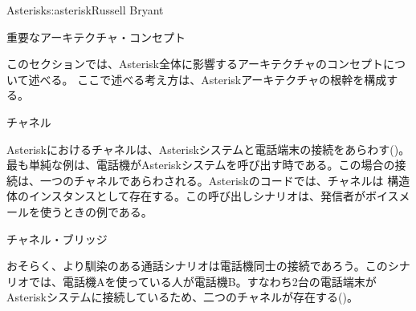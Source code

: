 \begin{aosachapter}{Asterisk}{s:asterisk}{Russell Bryant}
\begin{aosasect1}{重要なアーキテクチャ・コンセプト}

このセクションでは、Asterisk全体に影響するアーキテクチャのコンセプトについて述べる。
ここで述べる考え方は、Asteriskアーキテクチャの根幹を構成する。

\begin{aosasect2}{チャネル}

Asteriskにおけるチャネルは、Asteriskシステムと電話端末の接続をあらわす()。最も単純な例は、電話機がAsteriskシステムを呼び出す時である。この場合の接続は、一つのチャネルであらわされる。Asteriskのコードでは、チャネルは 構造体のインスタンスとして存在する。この呼び出しシナリオは、発信者がボイスメールを使うときの例である。


\end{aosasect2}

\begin{aosasect2}{チャネル・ブリッジ}

おそらく、より馴染のある通話シナリオは電話機同士の接続であろう。このシナリオでは、電話機Aを使っている人が電話機B。すなわち2台の電話端末がAsteriskシステムに接続しているため、二つのチャネルが存在する()。


\end{aosasect2}
\end{aosasect1}
\end{aosachapter}
